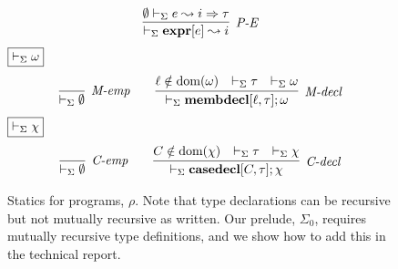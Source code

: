 \begin{figure}[t]
\[\begin{array}{c}
\infer[\textit{P-E}]
	{\vdash_\Sigma  \keyw{expr}[e] \leadsto i} 
	{\emptyset \vdash_\Sigma e \leadsto i \Rightarrow \tau}
\end{array}
\vspace{-15px}
\]
$\fbox{$\vdash_\Sigma \omega$}$
\[
\begin{array}{c}
\infer[\textit{M-emp}]
	{\vdash_\Sigma \emptyset}
	{ }~~~~~~
\infer[\textit{M-decl}]
	{\vdash_\Sigma \keyw{membdecl}[\ell, \tau]; \omega}
	{ \ell \notin \text{dom}(\omega) & \vdash_\Sigma \tau & \vdash_\Sigma \omega}
\end{array}
\]
$\fbox{$\vdash_\Sigma \chi$}$
\vspace{-15pt}\[
\begin{array}{c}
\infer[\textit{C-emp}]{\vdash_\Sigma \emptyset}{ }
~~~~~~
\infer[\textit{C-decl}]
	{\vdash_\Sigma \keyw{casedecl}[C, \tau]; \chi} 
	{C \notin \text{dom}(\chi) & \vdash_\Sigma \tau & \vdash_\Sigma \chi}
\end{array}
\]
\vspace{-10px}
\caption{Statics for programs, $\rho$. Note that type declarations can be recursive but not mutually recursive as written. Our prelude, $\Sigma_0$, requires mutually recursive type definitions, and we show how to add this in the technical report.}
\vspace{-15px}
\end{figure}
